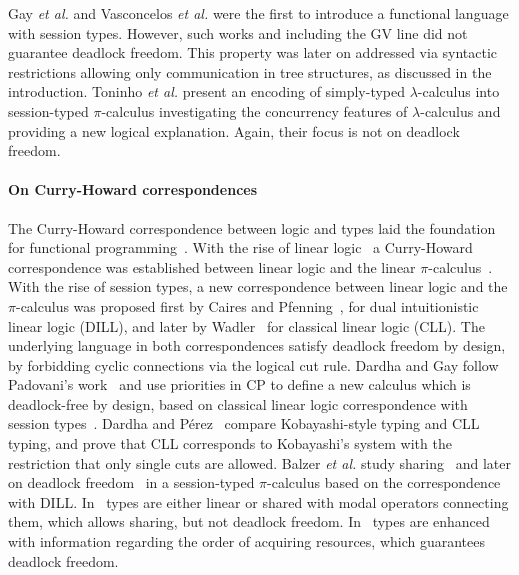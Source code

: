 \documentclass[main.tex]{subfiles}
\begin{document}
Gay \emph{et al.} \cite{gaynagarajan03} and Vasconcelos \emph{et al.} \cite{vasconcelosravara04,vasconcelosgay06} were the first to introduce a functional language with session types. However, such works and including the GV line \cite{gayvasconcelos10,gayvasconcelos12} did not guarantee deadlock freedom. This property was later on addressed \cite{lindleymorris15,wadler15} via syntactic restrictions allowing only communication in tree structures, as discussed in the introduction. Toninho \emph{et al.} \cite{toninhocaires12} present an encoding of simply-typed $\lambda$-calculus into session-typed $\pi$-calculus investigating the concurrency features of $\lambda$-calculus and providing a new logical explanation. Again, their focus is not on deadlock freedom.


\paragraph{On Curry-Howard correspondences}
The Curry-Howard correspondence between logic and types laid the foundation for functional programming~\cite{wadler15}. With the rise of linear logic~\cite{girard87} a Curry-Howard correspondence was established between linear logic and the linear $\pi$-calculus~\cite{abramsky94,bellinscott94}. With the rise of session types, a new correspondence between linear logic and the $\pi$-calculus was proposed first by Caires and Pfenning~\cite{cairespfenning10}, for dual intuitionistic linear logic (DILL), and later by Wadler~\cite{wadler15} for classical linear logic (CLL). The underlying language in both correspondences satisfy deadlock freedom by design, by forbidding cyclic connections via the logical cut rule. Dardha and Gay follow Padovani's work~\cite{padovani14} and use priorities in CP to define a new calculus which is deadlock-free by design, based on classical linear logic correspondence with session types~\cite{wadler12}. Dardha and P\'{e}rez~\cite{dardhaperez15} compare Kobayashi-style typing and CLL typing, and prove that CLL corresponds to Kobayashi's system with the restriction that only single cuts are allowed. Balzer \emph{et al.} study sharing~\cite{balzerpfenning17} and later on deadlock freedom~\cite{balzertoninho19} in a session-typed $\pi$-calculus based on the correspondence with DILL. In~\cite{balzerpfenning17} types are either linear or shared with modal operators connecting them, which allows sharing, but not deadlock freedom. In~\cite{balzertoninho19} types are enhanced with information regarding the order of acquiring resources, which guarantees deadlock freedom.
\end{document}
